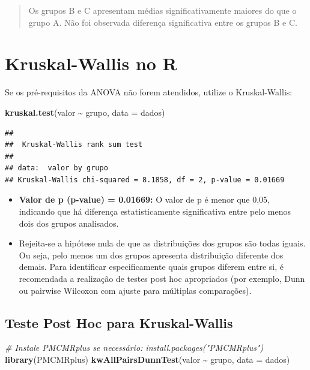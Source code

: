 \documentclass[
]{book}
\newenvironment{Shaded}{\begin{snugshade}}{\end{snugshade}}
\newcommand{\AttributeTok}[1]{\textcolor[rgb]{0.13,0.29,0.53}{#1}}
\newcommand{\CommentTok}[1]{\textcolor[rgb]{0.56,0.35,0.01}{\textit{#1}}}
\newcommand{\FunctionTok}[1]{\textcolor[rgb]{0.13,0.29,0.53}{\textbf{#1}}}
\newcommand{\NormalTok}[1]{#1}
\newcommand{\SpecialCharTok}[1]{\textcolor[rgb]{0.81,0.36,0.00}{\textbf{#1}}}
\begin{document}
\begin{quote}
Os grupos B e C apresentam médias significativamente maiores do que o grupo A. Não foi observada diferença significativa entre os grupos B e C.
\end{quote}

\section{Kruskal-Wallis no R}\label{kruskal-wallis-no-r}

Se os pré-requisitos da ANOVA não forem atendidos, utilize o Kruskal-Wallis:

\begin{Shaded}
\begin{Highlighting}[]
\FunctionTok{kruskal.test}\NormalTok{(valor }\SpecialCharTok{\textasciitilde{}}\NormalTok{ grupo, }\AttributeTok{data =}\NormalTok{ dados)}
\end{Highlighting}
\end{Shaded}

\begin{verbatim}
## 
##  Kruskal-Wallis rank sum test
## 
## data:  valor by grupo
## Kruskal-Wallis chi-squared = 8.1858, df = 2, p-value = 0.01669
\end{verbatim}

\begin{itemize}
\item
  \textbf{Valor de p (p-value) = 0.01669:} O valor de p é menor que 0,05, indicando que há diferença estatisticamente significativa entre pelo menos dois dos grupos analisados.
\item
  Rejeita-se a hipótese nula de que as distribuições dos grupos são todas iguais. Ou seja, pelo menos um dos grupos apresenta distribuição diferente dos demais. Para identificar especificamente quais grupos diferem entre si, é recomendada a realização de testes post hoc apropriados (por exemplo, Dunn ou pairwise Wilcoxon com ajuste para múltiplas comparações).
\end{itemize}

\subsection{Teste Post Hoc para Kruskal-Wallis}\label{teste-post-hoc-para-kruskal-wallis}

\begin{Shaded}
\begin{Highlighting}[]
\CommentTok{\# Instale PMCMRplus se necessário: install.packages("PMCMRplus")}
\FunctionTok{library}\NormalTok{(PMCMRplus)}
\FunctionTok{kwAllPairsDunnTest}\NormalTok{(valor }\SpecialCharTok{\textasciitilde{}}\NormalTok{ grupo, }\AttributeTok{data =}\NormalTok{ dados)}
\end{Highlighting}
\end{Shaded}
\end{document}
